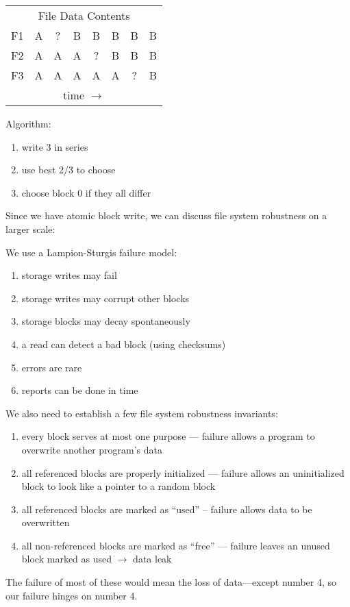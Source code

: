 \documentclass[../../lecture_notes.tex]{subfiles}
\begin{document}
\begin{minipage}{0.6\linewidth}
\begin{center}
\begin{tabular}{ c | c | c | c | c | c | c | c | }
	\multicolumn{8}{c}{File Data Contents} \\
	\cline{2-8}
	F1 & A & ? & B & B & B & B & B \\
	\cline{2-8}
	F2 & A & A & A & ? & B & B & B \\
	\cline{2-8}
	F3 & A & A & A & A & A & ? & B \\
	\cline{2-8}
	\multicolumn{8}{c}{time $\to$}
\end{tabular}
\end{center}
\end{minipage}%
\begin{minipage}{0.4\linewidth}
Algorithm:
\begin{enumerate}[nosep]
	\item write 3 in series
	\item use best 2/3 to choose
	\item choose block 0 if they all differ
\end{enumerate}
\end{minipage}


Since we have atomic block write, we can discuss file system robustness on a larger scale:

We use a Lampion-Sturgis failure model:
\begin{enumerate}[nosep]
	\item storage writes may fail
	\item storage writes may corrupt other blocks
	\item storage blocks may decay spontaneously
	\item a read can detect a bad block (using checksums)
	\item errors are rare
	\item reports can be done in time
\end{enumerate}

We also need to establish a few file system robustness invariants:
\begin{enumerate}
\item every block serves at most one purpose --- failure allows a program to overwrite another program’s data
\item all referenced blocks are properly initialized --- failure allows an uninitialized block to look like a pointer to a random block
\item all referenced blocks are marked as “used” -- failure allows data to be overwritten
\item all non-referenced blocks are marked as “free” --- failure leaves an unused block marked as used $\to$ data leak
\end{enumerate}
The failure of most of these would mean the loss of data—except number 4, so our failure hinges on number 4.
\end{document}
